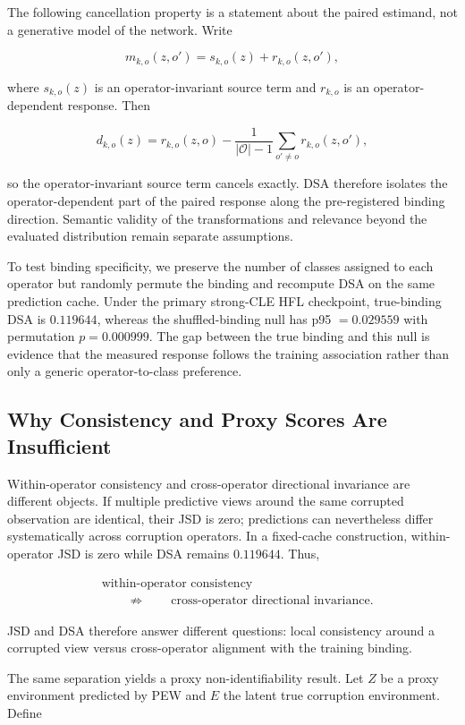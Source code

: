 The following cancellation property is a statement about the paired estimand, not a generative model of the network. Write

\[
m_{k,o}(z,o')=s_{k,o}(z)+r_{k,o}(z,o'),
\]

where \(s_{k,o}(z)\) is an operator-invariant source term and \(r_{k,o}\) is an operator-dependent response. Then

\[
d_{k,o}(z)=r_{k,o}(z,o)
-\frac{1}{|\mathcal O|-1}\sum_{o'\neq o}r_{k,o}(z,o'),
\]

so the operator-invariant source term cancels exactly. DSA therefore isolates the operator-dependent part of the paired response along the pre-registered binding direction. Semantic validity of the transformations and relevance beyond the evaluated distribution remain separate assumptions.

To test binding specificity, we preserve the number of classes assigned to each operator but randomly permute the binding and recompute DSA on the same prediction cache. Under the primary strong-CLE HFL checkpoint, true-binding DSA is \(0.119644\), whereas the shuffled-binding null has p95 \(=0.029559\) with permutation \(p=0.000999\). The gap between the true binding and this null is evidence that the measured response follows the training association rather than only a generic operator-to-class preference.

\subsection{Why Consistency and Proxy Scores Are Insufficient}

Within-operator consistency and cross-operator directional invariance are different objects. If multiple predictive views around the same corrupted observation are identical, their JSD is zero; predictions can nevertheless differ systematically across corruption operators. In a fixed-cache construction, within-operator JSD is zero while DSA remains \(0.119644\). Thus,

\[
\begin{aligned}
&\text{within-operator consistency}\\
&\qquad\not\Rightarrow\qquad
\text{cross-operator directional invariance}.
\end{aligned}
\]

JSD and DSA therefore answer different questions: local consistency around a corrupted view versus cross-operator alignment with the training binding.

The same separation yields a proxy non-identifiability result. Let \(Z\) be a proxy environment predicted by PEW and \(E\) the latent true corruption environment. Define

